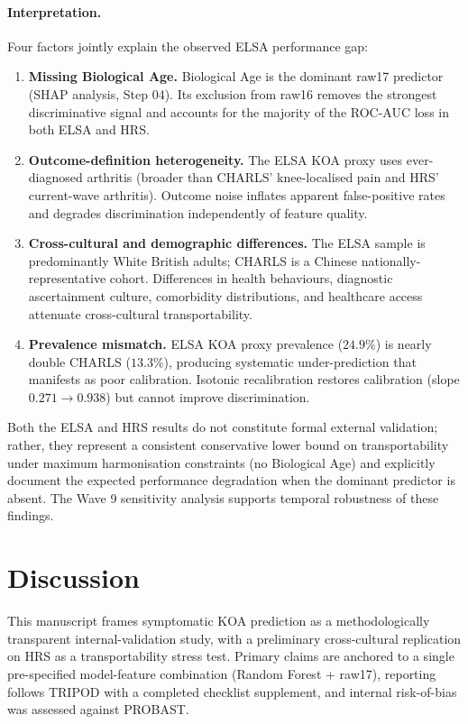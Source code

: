 \documentclass[11pt,a4paper]{article}
\begin{document}
\paragraph{Interpretation.} Four factors jointly explain the observed ELSA performance gap:
\begin{enumerate}
  \item \textbf{Missing Biological Age.} Biological Age is the dominant raw17 predictor (SHAP
        analysis, Step 04). Its exclusion from raw16 removes the strongest discriminative signal
        and accounts for the majority of the ROC-AUC loss in both ELSA and HRS.
  \item \textbf{Outcome-definition heterogeneity.} The ELSA KOA proxy uses ever-diagnosed
        arthritis (broader than CHARLS' knee-localised pain and HRS' current-wave arthritis).
        Outcome noise inflates apparent false-positive rates and degrades discrimination
        independently of feature quality.
  \item \textbf{Cross-cultural and demographic differences.} The ELSA sample is predominantly
        White British adults; CHARLS is a Chinese nationally-representative cohort. Differences
        in health behaviours, diagnostic ascertainment culture, comorbidity distributions, and
        healthcare access attenuate cross-cultural transportability.
  \item \textbf{Prevalence mismatch.} ELSA KOA proxy prevalence ($24.9\%$) is nearly double
        CHARLS ($13.3\%$), producing systematic under-prediction that manifests as poor
        calibration. Isotonic recalibration restores calibration (slope $0.271 \rightarrow
        0.938$) but cannot improve discrimination.
\end{enumerate}

Both the ELSA and HRS results do not constitute formal external validation; rather, they
represent a consistent conservative lower bound on transportability under maximum harmonisation
constraints (no Biological Age) and explicitly document the expected performance degradation
when the dominant predictor is absent. The Wave 9 sensitivity analysis supports temporal
robustness of these findings.

\section{Discussion}
This manuscript frames symptomatic KOA prediction as a methodologically transparent
internal-validation study, with a preliminary cross-cultural replication on HRS as a transportability
stress test. Primary claims are anchored to a single pre-specified model-feature combination (Random
Forest + raw17), reporting follows TRIPOD\cite{Collins2015} with a completed checklist supplement,
and internal risk-of-bias was assessed against PROBAST\cite{Wolff2019}.
\end{document}
